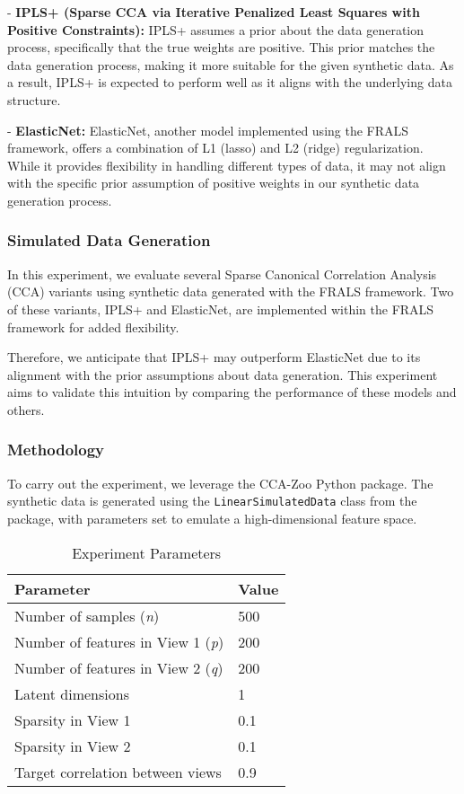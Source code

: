 - \textbf{IPLS+ (Sparse CCA via Iterative Penalized Least Squares with Positive Constraints):} IPLS+ assumes a prior about the data generation process, specifically that the true weights are positive.
This prior matches the data generation process, making it more suitable for the given synthetic data.
As a result, IPLS+ is expected to perform well as it aligns with the underlying data structure.

- \textbf{ElasticNet:} ElasticNet, another model implemented using the FRALS framework, offers a combination of L1 (lasso) and L2 (ridge) regularization.
While it provides flexibility in handling different types of data, it may not align with the specific prior assumption of positive weights in our synthetic data generation process.

\subsubsection{Simulated Data Generation}\label{subsubsec:simulated-data-generation}

In this experiment, we evaluate several Sparse Canonical Correlation Analysis (CCA) variants using synthetic data generated with the FRALS framework. Two of these variants, IPLS+ and ElasticNet, are implemented within the FRALS framework for added flexibility.

Therefore, we anticipate that IPLS+ may outperform ElasticNet due to its alignment with the prior assumptions about data generation. This experiment aims to validate this intuition by comparing the performance of these models and others.

\subsubsection{Methodology}

To carry out the experiment, we leverage the CCA-Zoo Python package. The synthetic data is generated using the \texttt{LinearSimulatedData} class from the package, with parameters set to emulate a high-dimensional feature space.

\begin{table}[h]
\centering
\caption{Experiment Parameters}
\begin{tabular}{l|l}
\textbf{Parameter} & \textbf{Value} \\
\hline
Number of samples (\textit{n}) & 500 \\
Number of features in View 1 (\textit{p}) & 200 \\
Number of features in View 2 (\textit{q}) & 200 \\
Latent dimensions & 1 \\
Sparsity in View 1 & 0.1 \\
Sparsity in View 2 & 0.1 \\
Target correlation between views & 0.9 \\
\end{tabular}
\label{table:experiment-parameters}
\end{table}

